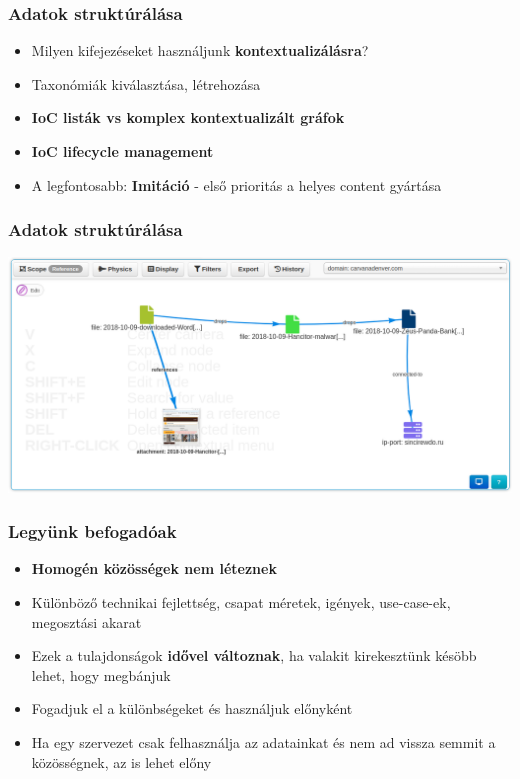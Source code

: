 \begin{frame}
  \frametitle{Adatok struktúrálása}
  \begin{itemize}
      \item Milyen kifejezéseket használjunk {\bf kontextualizálásra}?
      \item Taxonómiák kiválasztása, létrehozása
      \item {\bf IoC listák vs komplex kontextualizált gráfok}
      \item {\bf IoC lifecycle management}
      \item A legfontosabb: {\bf Imitáció} - első prioritás a helyes content gyártása
  \end{itemize}
\end{frame}

\begin{frame}
  \frametitle{Adatok struktúrálása}
  \begin{center}
    \includegraphics[scale=0.3]{pics/eventgraph.png}
  \end{center}
\end{frame}


\begin{frame}
  \frametitle{Legyünk befogadóak}
  \begin{itemize}
      \item {\bf Homogén közösségek nem léteznek}
      \item Különböző technikai fejlettség, csapat méretek, igények, use-case-ek, megosztási akarat
      \item Ezek a tulajdonságok {\bf idővel változnak}, ha valakit kirekesztünk késöbb lehet, hogy megbánjuk
      \item Fogadjuk el a különbségeket és használjuk előnyként
      \item Ha egy szervezet csak felhasználja az adatainkat és nem ad vissza semmit a közösségnek, az is lehet előny
  \end{itemize}
\end{frame}

